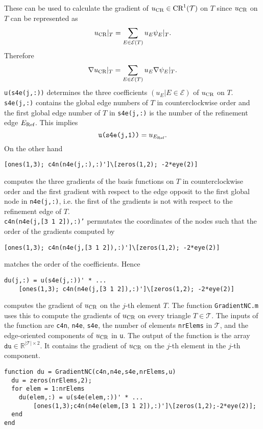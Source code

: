 These can be used to calculate the gradient of 
$u_{\textup{CR}} \in \textup{CR}^1(\mathcal T)$ on $T$
since $u_{\textup{CR}}$ on $T$ can be represented as
\[
u_{\textup{CR}}|_T = \sum_{E\in\mathcal E (T)}u_E\psi_E|_T.
\]
Therefore
\[
\nabla u_{\textup{CR}}|_T = \sum_{E\in\mathcal E (T)}u_E\nabla\psi_E|_T.
\]
\texttt{u(s4e(j,:))} determines the three
coefficients $(u_E|E\in\mathcal E)$ of $u_{\textup{CR}}$
on $T$.
\texttt{s4e(j,:)} contains the global edge numbers 
of $T$ in counterclockwise order and
the first global edge number of $T$ in \texttt{s4e(j,:)} is the number
of the refinement edge $E_\textup{Ref}$.
This implies 
$$
\texttt{u(s4e(j,1))}=u_{E_\textup{Ref}}.
$$
On the other hand 
\begin{lstlisting}[frame = single, numbers = none]
[ones(1,3); c4n(n4e(j,:),:)']\[zeros(1,2); -2*eye(2)]
\end{lstlisting}
computes the three gradients of the basis functions on $T$ in counterclockwise 
order and the first gradient with respect to
the edge opposit to the first global node in \texttt{n4e(j,:)}, i.e. the
first of the gradients is not with respect to the refinement edge of $T$. \\
\texttt{c4n(n4e(j,[3 1 2]),:)'} permutates the coordinates of the nodes such that the
order of the gradients computed by
\begin{lstlisting}[frame = single, numbers = none]
[ones(1,3); c4n(n4e(j,[3 1 2]),:)']\[zeros(1,2); -2*eye(2)]
\end{lstlisting}
matches the order of the coefficients.
Hence
\begin{lstlisting}[frame=single,numbers=none]
du(j,:) = u(s4e(j,:))' * ...
    [ones(1,3); c4n(n4e(j,[3 1 2]),:)']\[zeros(1,2); -2*eye(2)]
\end{lstlisting}
computes the gradient of $u_{\textup{CR}}$ on the $j$-th element $T$.
The function \texttt{GradientNC.m}
uses this to compute the gradients of $u_{\textup{CR}}$ on every triangle
$T\in\mathcal T$. The inputs of the function are \texttt{c4n},
\texttt{n4e}, \texttt{s4e}, the number of elements \texttt{nrElems} in $\mathcal T$,
and the edge-oriented components of $u_{\textup{CR}}$ in \texttt{u}.
The output of the function is the array 
$\texttt{du}\in\mathbb R^{|\mathcal T|\times 2}$. It contains
the gradient of $u_{\textup{CR}}$ on
  the $j$-th element in the $j$-th component.
\begin{lstlisting}[frame = single,numbers=none]
function du = GradientNC(c4n,n4e,s4e,nrElems,u)
  du = zeros(nrElems,2);
  for elem = 1:nrElems
    du(elem,:) = u(s4e(elem,:))' * ...
        [ones(1,3);c4n(n4e(elem,[3 1 2]),:)']\[zeros(1,2);-2*eye(2)];          
  end
end
\end{lstlisting}





